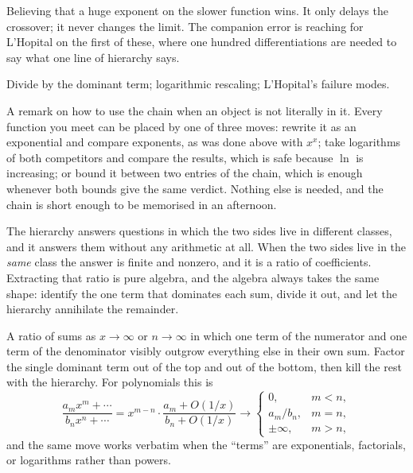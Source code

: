 \begin{trap}
Believing that a huge exponent on the slower function wins. It only delays the crossover; it never changes the limit. The companion error is reaching for L'Hopital on the first of these, where one hundred differentiations are needed to say what one line of hierarchy says.
\end{trap}

\begin{seealsob}Divide by the dominant term; logarithmic rescaling; L'Hopital's failure modes.\end{seealsob}

A remark on how to use the chain when an object is not literally in it. Every function you meet can be placed by one of three moves: rewrite it as an exponential and compare exponents, as was done above with $x^{x}$; take logarithms of both competitors and compare the results, which is safe because $\ln$ is increasing; or bound it between two entries of the chain, which is enough whenever both bounds give the same verdict. Nothing else is needed, and the chain is short enough to be memorised in an afternoon.

The hierarchy answers questions in which the two sides live in different classes, and it answers them without any arithmetic at all. When the two sides live in the \emph{same} class the answer is finite and nonzero, and it is a ratio of coefficients. Extracting that ratio is pure algebra, and the algebra always takes the same shape: identify the one term that dominates each sum, divide it out, and let the hierarchy annihilate the remainder.

\cue A ratio of sums as $x\to\infty$ or $n\to\infty$ in which one term of the numerator and one term of the denominator visibly outgrow everything else in their own sum.
\method Factor the single dominant term out of the top and out of the bottom, then kill the rest with the hierarchy. For polynomials this is
\[
\frac{a_mx^{m}+\cdots}{b_nx^{n}+\cdots}=x^{m-n}\cdot\frac{a_m+O(1/x)}{b_n+O(1/x)}\longrightarrow
\begin{cases}0,& m<n,\\[2pt] a_m/b_n,& m=n,\\[2pt] \pm\infty,& m>n,\end{cases}
\]
and the same move works verbatim when the ``terms'' are exponentials, factorials, or logarithms rather than powers.

